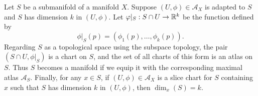 \begin{proposition} \label{submanifolds-are-manifolds}
	Let $S$ be a submanifold of a manifold $X$. Suppose $(U, \phi) \in \mathscr{A}_X$ is adapted to $S$ and $S$ has dimension $k$ in $(U, \phi)$. Let $\varphi|_S : S \cap U \to \mathbb{R}^k$ be the function defined by 
	\[ \phi|_S(p) = (\phi_1(p), \dotsc, \phi_k(p)). \]
	Regarding $S$ as a topological space using the subspace topology, the pair $(S \cap U, \phi|_S)$ is a chart on $S$, and the set of all charts of this form is an atlas on $S$. Thus $S$ becomes a manifold if we equip it with the corresponding maximal atlas $\mathscr{A}_S$. Finally, for any $x \in S$, if $(U, \phi) \in \mathscr{A}_X$ is a slice chart for $S$ containing $x$ such that $S$ has dimension $k$ in $(U,\phi)$, then $\dim_x(S) = k$. 
\end{proposition}

